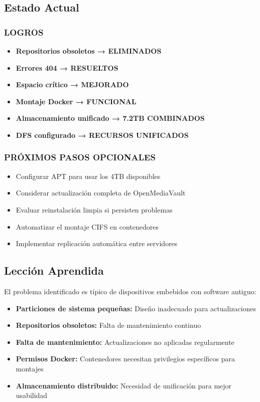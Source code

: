 \documentclass[12pt, a4paper]{article}
\begin{document}
\subsection{Estado Actual}
\label{subsec:estado_actual}

\subsubsection{LOGROS}
\begin{itemize}
    \item \textbf{Repositorios obsoletos → ELIMINADOS }
    \item \textbf{Errores 404 → RESUELTOS }
    \item \textbf{Espacio crítico → MEJORADO}
    \item \textbf{Montaje Docker → FUNCIONAL}
    \item \textbf{Almacenamiento unificado → 7.2TB COMBINADOS}
    \item \textbf{DFS configurado → RECURSOS UNIFICADOS}
\end{itemize}

\subsubsection{PRÓXIMOS PASOS OPCIONALES}
\begin{itemize}
    \item Configurar APT para usar los 4TB disponibles
    \item Considerar actualización completa de OpenMediaVault
    \item Evaluar reinstalación limpia si persisten problemas
    \item Automatizar el montaje CIFS en contenedores
    \item Implementar replicación automática entre servidores
\end{itemize}

\subsection{Lección Aprendida}
\label{subsec:leccion_aprendida}

El problema identificado es típico de dispositivos embebidos con software antiguo:

\begin{itemize}
    \item \textbf{Particiones de sistema pequeñas:} Diseño inadecuado para actualizaciones
    \item \textbf{Repositorios obsoletos:} Falta de mantenimiento continuo
    \item \textbf{Falta de mantenimiento:} Actualizaciones no aplicadas regularmente
    \item \textbf{Permisos Docker:} Contenedores necesitan privilegios específicos para montajes
    \item \textbf{Almacenamiento distribuido:} Necesidad de unificación para mejor usabilidad
\end{itemize}
\end{document}

